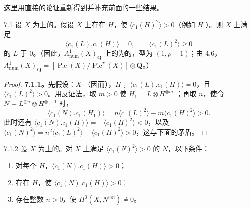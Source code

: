 这里用直接的论证重新得到并补充前面的一些结果。
\begin{SGAresult}{}{7.1}
设 $X$ 为上的。假设 $X$ 上存在 $H$，使 $\langle c_1(H)^2\rangle>0$（例如 $H$ ）。则 $X$ 上满足
\[\langle c_1(L).c_1(H)\rangle=0,\qquad\langle c_1(L)^2\rangle\geq0\]
的 $L$ 于 $0$。（因此，$A^1_{\mathrm{num}}(X)_{\mathbf Q}$ 上的为的，型为 $(1,\rho-1)$；由 4.6，$A^1_{\mathrm{num}}(X)_{\mathbf Q}=[\operatorname{Pic}(X)/\operatorname{Pic}^\tau(X)]\otimes\mathbf Q$。）
\end{SGAresult}
\begin{proof}
\textbf{7.1.1。}先假设：$X$ （因而），$H$ ，$\langle c_1(L).c_1(H)\rangle=0$，且 $\langle c_1(L)^2\rangle>0$。用反证法，取 $m>0$ 使 $H_1=L\otimes H^{\otimes m}$ ；再取 $n$，使令 $N=L^{\otimes n}\otimes H^{\otimes-1}$ 时，
\[\langle c_1(N).c_1(H_1)\rangle=n\langle c_1(L)^2\rangle-m\langle c_1(H)^2\rangle>0.\]
此时还有 $\langle c_1(N).c_1(H)\rangle=-\langle c_1(H)^2\rangle<0$，以及 $\langle c_1(N)^2\rangle=n^2\langle c_1(L)^2\rangle+\langle c_1(H)^2\rangle>0$，这与下面的矛盾。
\end{proof}
\begin{SGAresult}{}{7.1.2}
设 $X$ 为上的。对 $X$ 上满足 $\langle c_1(N)^2\rangle>0$ 的 $N$，以下条件：
\begin{enumerate}
\item[(i)] 对每个 $H$，$\langle c_1(N).c_1(H)\rangle>0$；
\item[(i')] 存在 $H$，使 $\langle c_1(N).c_1(H)\rangle>0$；
\item[(ii)] 存在整数 $n>0$，使 $H^0(X,N^{\otimes n})\neq0$。
\end{enumerate}
\end{SGAresult}
